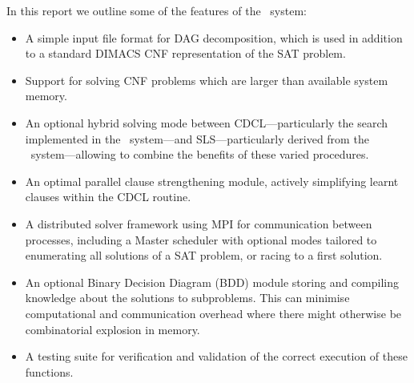 \documentclass[
10pt, %
a4paper, %
oneside, %
headinclude,footinclude, %
BCOR5mm, %
]{scrartcl}
\begin{document}
In this report we outline some of the features of the \dagster\ system:
\begin{itemize}
\item	A simple input file format for DAG decomposition, which is used in addition to a standard DIMACS CNF representation of the SAT problem.
\item	Support for solving CNF problems which are larger than available system memory.
\item	An optional hybrid solving mode between CDCL---particularly the search implemented in the \tinisat\ system---and SLS---particularly derived from the \gnoveltyp\ system---allowing \dagster to combine the benefits of these varied procedures.
\item	An optimal parallel clause strengthening module, actively simplifying learnt clauses within the CDCL routine.
\item	A distributed solver framework using MPI for communication between processes, including a Master scheduler with optional modes tailored to enumerating all solutions of a SAT problem, or racing to a first solution.
\item	An optional Binary Decision Diagram (BDD) module storing and compiling knowledge about the solutions to subproblems. This can minimise computational and communication overhead where there might otherwise be combinatorial explosion in memory.
\item   A testing suite for verification and validation of the correct execution of these functions.
\end{itemize}


\end{document}
